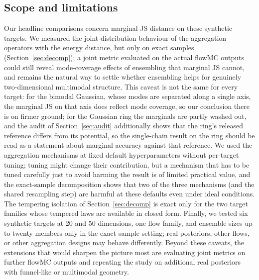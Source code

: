 \documentclass[11pt]{article}
\begin{document}
\subsection{Scope and limitations}
Our headline comparisons concern marginal JS distance on these synthetic
targets. We measured the joint-distribution behaviour of the aggregation
operators with the energy distance, but only on exact samples
(Section~\ref{sec:decomp}); a joint metric evaluated on the actual flowMC
outputs could still reveal mode-coverage effects of ensembling that marginal
JS cannot, and remains the natural way to settle whether ensembling helps for
genuinely two-dimensional multimodal structure. This caveat is not the same
for every target: for the bimodal Gaussian, whose modes are separated along a
single axis, the marginal JS on that axis does reflect mode coverage, so our
conclusion there is on firmer ground; for the Gaussian ring the marginals are
partly washed out, and the audit of Section~\ref{sec:audit} additionally
shows that the ring's released reference differs from its potential, so the
single-chain result on the ring should be read as a statement about marginal
accuracy against that reference. We used the aggregation mechanisms at fixed
default hyperparameters without per-target tuning; tuning might change their
contribution, but a mechanism that has to be tuned carefully just to avoid
harming the result is of limited practical value, and the exact-sample
decomposition shows that two of the three mechanisms (and the shared
resampling step) are harmful at these defaults even under ideal conditions.
The tempering isolation of Section~\ref{sec:decomp} is exact only for the two
target families whose tempered laws are available in closed form. Finally, we
tested six synthetic targets at 20 and 50 dimensions, one flow family, and
ensemble sizes up to twenty members only in the exact-sample setting; real
posteriors, other flows, or other aggregation designs may behave differently.
Beyond these caveats, the extensions that would sharpen the picture most are
evaluating joint metrics on further flowMC outputs and repeating the study on
additional real posteriors with funnel-like or multimodal geometry.
\end{document}

